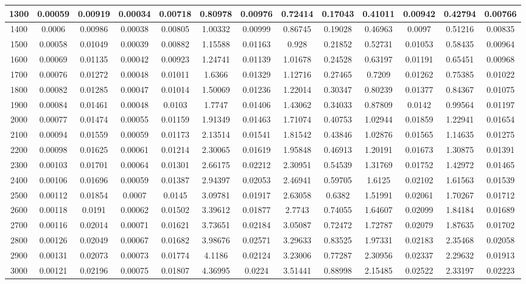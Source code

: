\documentclass[conference]{IEEEtran}
\begin{document}
\begin{table}[!ht]
\begin{tabular}{|c|c|c|c|c|c|c|c|c|c|c|c|c|}
\hline
1300 & 0.00059 & 0.00919 & 0.00034 & 0.00718 & 0.80978 & 0.00976 & 0.72414 & 0.17043 &0.41011 & 0.00942 & 0.42794 & 0.00766 \\
\hline
1400 & 0.0006 & 0.00986 & 0.00038 & 0.00805 & 1.00332 & 0.00999 & 0.86745 & 0.19028 &0.46963 & 0.0097 & 0.51216 & 0.00835 \\
\hline
1500 & 0.00058 & 0.01049 & 0.00039 & 0.00882 & 1.15588 & 0.01163 & 0.928 & 0.21852 &0.52731 & 0.01053 & 0.58435 & 0.00964 \\
\hline
1600 & 0.00069 & 0.01135 & 0.00042 & 0.00923 & 1.24741 & 0.01139 & 1.01678 & 0.24528 &0.63197 & 0.01191 & 0.65451 & 0.00968 \\
\hline
1700 & 0.00076 & 0.01272 & 0.00048 & 0.01011 & 1.6366 & 0.01329 & 1.12716 & 0.27465 &0.7209 & 0.01262 & 0.75385 & 0.01022 \\
\hline
1800 & 0.00082 & 0.01285 & 0.00047 & 0.01014 & 1.50069 & 0.01236 & 1.22014 & 0.30347 &0.80239 & 0.01377 & 0.84367 & 0.01075 \\
\hline
1900 & 0.00084 & 0.01461 & 0.00048 & 0.0103 & 1.7747 & 0.01406 & 1.43062 & 0.34033 &0.87809 & 0.0142 & 0.99564 & 0.01197 \\
\hline
2000 & 0.00077 & 0.01474 & 0.00055 & 0.01159 & 1.91349 & 0.01463 & 1.71074 & 0.40753 &1.02944 & 0.01859 & 1.22941 & 0.01654 \\
\hline
2100 & 0.00094 & 0.01559 & 0.00059 & 0.01173 & 2.13514 & 0.01541 & 1.81542 & 0.43846 &1.02876 & 0.01565 & 1.14635 & 0.01275 \\
\hline
2200 & 0.00098 & 0.01625 & 0.00061 & 0.01214 & 2.30065 & 0.01619 & 1.95848 & 0.46913 &1.20191 & 0.01673 & 1.30875 & 0.01391 \\
\hline
2300 & 0.00103 & 0.01701 & 0.00064 & 0.01301 & 2.66175 & 0.02212 & 2.30951 & 0.54539 &1.31769 & 0.01752 & 1.42972 & 0.01465 \\
\hline
2400 & 0.00106 & 0.01696 & 0.00059 & 0.01387 & 2.94397 & 0.02053 & 2.46941 & 0.59705 &1.6125 & 0.02102 & 1.61563 & 0.01539 \\
\hline
2500 & 0.00112 & 0.01854 & 0.0007 & 0.0145 & 3.09781 & 0.01917 & 2.63058 & 0.6382 &1.51991 & 0.02061 & 1.70267 & 0.01712 \\
\hline
2600 & 0.00118 & 0.0191 & 0.00062 & 0.01502 & 3.39612 & 0.01877 & 2.7743 & 0.74055 &1.64607 & 0.02099 & 1.84184 & 0.01689 \\
\hline
2700 & 0.00116 & 0.02014 & 0.00071 & 0.01621 & 3.73651 & 0.02184 & 3.05087 & 0.72472 &1.72787 & 0.02079 & 1.87635 & 0.01702 \\
\hline
2800 & 0.00126 & 0.02049 & 0.00067 & 0.01682 & 3.98676 & 0.02571 & 3.29633 & 0.83525 &1.97331 & 0.02183 & 2.35468 & 0.02058 \\
\hline
2900 & 0.00131 & 0.02073 & 0.00073 & 0.01774 & 4.1186 & 0.02124 & 3.23006 & 0.77287 &2.30956 & 0.02337 & 2.29632 & 0.01913 \\
\hline
3000 & 0.00121 & 0.02196 & 0.00075 & 0.01807 & 4.36995 & 0.0224 & 3.51441 & 0.88998 &2.15485 & 0.02522 & 2.33197 & 0.02223 \\
\hline


\end{tabular}
\end{table}
\end{document}
